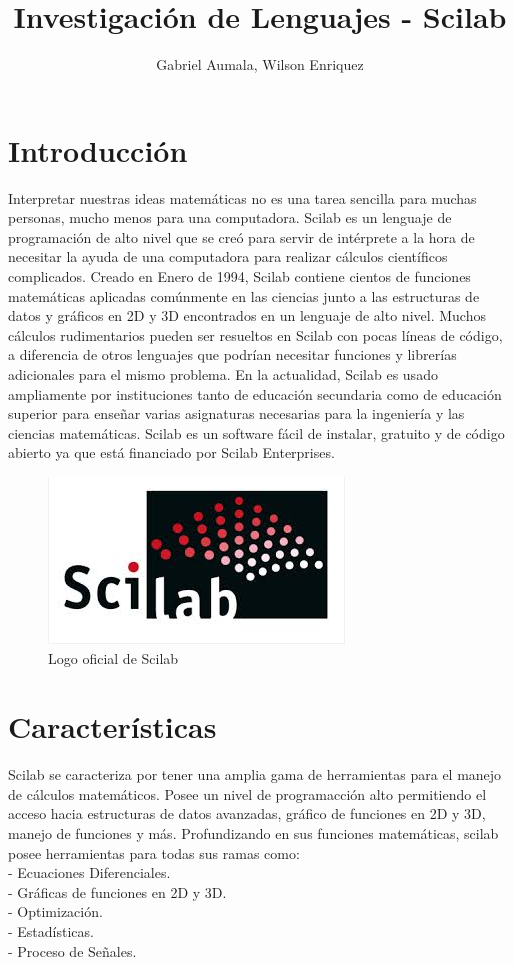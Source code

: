 \documentclass[11pt]{article} %
\title{Investigación de Lenguajes - Scilab}
\author{Gabriel Aumala, Wilson Enriquez}
\begin{document}
\maketitle

\section{Introducción}
Interpretar nuestras ideas matemáticas no es una tarea sencilla para muchas personas, mucho menos para una computadora. Scilab es un lenguaje de programación de alto nivel que se creó para servir de intérprete a la hora de necesitar la ayuda de una computadora para realizar cálculos científicos complicados.  Creado en Enero de 1994, Scilab contiene cientos de funciones matemáticas aplicadas comúnmente en las ciencias junto a las estructuras de datos y gráficos en 2D y 3D encontrados en un lenguaje de alto nivel. Muchos cálculos rudimentarios pueden ser resueltos en Scilab con pocas líneas de código, a diferencia de otros lenguajes que podrían necesitar funciones y librerías adicionales para el mismo problema. En la actualidad, Scilab es usado ampliamente por instituciones tanto de educación secundaria como de educación superior para enseñar varias asignaturas necesarias para la ingeniería y las ciencias matemáticas. Scilab es un software fácil de instalar, gratuito y de código abierto ya que está financiado por Scilab Enterprises. 

\begin{figure}[h]
  \centering
    \includegraphics{logosci}
  \caption{Logo oficial de Scilab}
  \label{fig:ejemplo}
\end{figure}

\section{Características}
Scilab se caracteriza por tener una amplia gama de herramientas para el manejo de cálculos matemáticos. Posee un nivel de programacción alto permitiendo el acceso hacia estructuras de datos avanzadas, gráfico de funciones en 2D y 3D, manejo de funciones y más.
Profundizando en sus funciones matemáticas, scilab posee herramientas para todas sus ramas como:
\\%
- Ecuaciones Diferenciales.
\\%
- Gráficas de funciones en 2D y 3D.
\\%
- Optimización.
\\%
- Estadísticas.
\\%
- Proceso de Señales.
\end{document}
